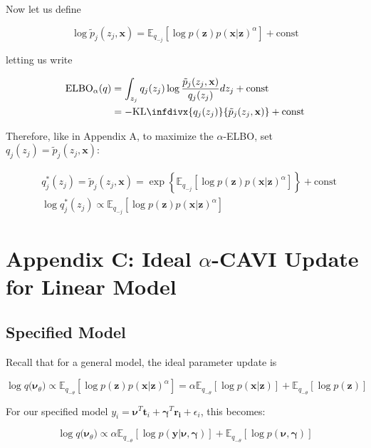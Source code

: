 \documentclass[letterpaper,12pt]{article}
\newcommand{\lc}{\left \{} %
\newcommand{\rc}{\right \}} %
\newcommand{\pz}{\ensuremath{p(\boldsymbol{z})}}
\newcommand{\pxgivenz}{\ensuremath{p(\boldsymbol{x} | \boldsymbol{z})}}
\newcommand{\nuv}{\boldsymbol{\nu}} %
\newcommand{\gammav}{\boldsymbol{\gamma}} %
\newcommand{\qtheta}{\ensuremath{q(\boldsymbol{\nu}_\theta})}
\newcommand{\x}{\mathbf{x}}
\newcommand{\kld}[2]{\ensuremath{\mathrm{KL}\infdivx{#1}{#2}}\xspace}
\newcommand{\Etheta}{\ensuremath{\mathbb{E}_{q_{-\theta}}}} %
\newcommand{\el}{\left[} %
\newcommand{\er}{\right]} %
\begin{document}
Now let us define

\begin{equation}
    \log \tilde{p}_j(z_j, \x) =  \mathbb{E}_{q_{-j}} \el \log \pz \pxgivenz^\alpha \er + \textrm{const}
\end{equation}

letting us write

\begin{equation}
\begin{split}
     \textrm{ELBO}_\alpha(q) &= \int_{z_j} q_j(z_j) \log \frac{\tilde{p}_j(z_j, \x)}{q_j(z_j)} dz_j + \textrm{const} \\
     &= - \kld{q_j(z_j)}{\tilde{p}_j(z_j, \x)} + \textrm{const}
\end{split}
\end{equation}

Therefore, like in Appendix A, to maximize the $\alpha$-ELBO, set $q_j(z_j) = \tilde{p}_j(z_j, \x) $:

\begin{equation}
\begin{split}
    &q_j^*(z_j) = \tilde{p}_j(z_j, \x) = \exp \lc \mathbb{E}_{q_{-j}} \el \log \pz \pxgivenz^\alpha \er \rc + \textrm{const}\\
    &\log q_j^*(z_j) \propto \mathbb{E}_{q_{-j}} \el \log \pz \pxgivenz^\alpha \er
\end{split}
\end{equation}

    \section{Appendix C: Ideal $\alpha$-CAVI Update for Linear Model}

\subsection{Specified Model}

Recall that for a general model, the ideal parameter update is

\begin{equation}
    \log \qtheta \propto \Etheta \el \log \pz \pxgivenz^\alpha \er = \alpha \Etheta \el \log \pxgivenz \er +  \Etheta \el \log \pz \er
\end{equation}

For our specified model $y_i=\mathbf{\nu}^T\mathbf{t}_i+\mathbf{\gamma}^T \mathbf{r_i}+\epsilon_i$, this becomes:

\begin{equation}
    \log \qtheta \propto \alpha \Etheta \el \log p(\boldsymbol{y}|\nuv, \gammav) \er +  \Etheta \el \log p(\nuv, \gammav) \er
\end{equation}
\end{document}
